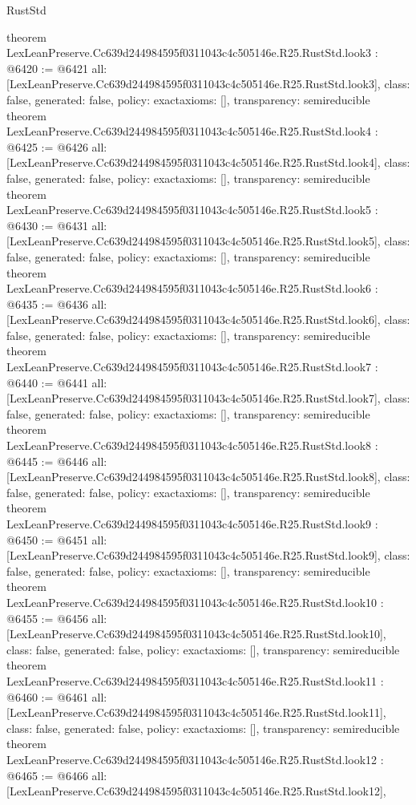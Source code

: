 \begin{lexlean}{RustStd}
\begin{coremodule}
{}
theorem LexLeanPreserve.Cc639d244984595f0311043c4c505146e.R25.RustStd.look3 : @6420 := @6421 {
  all: [LexLeanPreserve.Cc639d244984595f0311043c4c505146e.R25.RustStd.look3],
  class: false,
  generated: false,
  policy: exact{axioms: []},
  transparency: semireducible
}
theorem LexLeanPreserve.Cc639d244984595f0311043c4c505146e.R25.RustStd.look4 : @6425 := @6426 {
  all: [LexLeanPreserve.Cc639d244984595f0311043c4c505146e.R25.RustStd.look4],
  class: false,
  generated: false,
  policy: exact{axioms: []},
  transparency: semireducible
}
theorem LexLeanPreserve.Cc639d244984595f0311043c4c505146e.R25.RustStd.look5 : @6430 := @6431 {
  all: [LexLeanPreserve.Cc639d244984595f0311043c4c505146e.R25.RustStd.look5],
  class: false,
  generated: false,
  policy: exact{axioms: []},
  transparency: semireducible
}
theorem LexLeanPreserve.Cc639d244984595f0311043c4c505146e.R25.RustStd.look6 : @6435 := @6436 {
  all: [LexLeanPreserve.Cc639d244984595f0311043c4c505146e.R25.RustStd.look6],
  class: false,
  generated: false,
  policy: exact{axioms: []},
  transparency: semireducible
}
theorem LexLeanPreserve.Cc639d244984595f0311043c4c505146e.R25.RustStd.look7 : @6440 := @6441 {
  all: [LexLeanPreserve.Cc639d244984595f0311043c4c505146e.R25.RustStd.look7],
  class: false,
  generated: false,
  policy: exact{axioms: []},
  transparency: semireducible
}
theorem LexLeanPreserve.Cc639d244984595f0311043c4c505146e.R25.RustStd.look8 : @6445 := @6446 {
  all: [LexLeanPreserve.Cc639d244984595f0311043c4c505146e.R25.RustStd.look8],
  class: false,
  generated: false,
  policy: exact{axioms: []},
  transparency: semireducible
}
theorem LexLeanPreserve.Cc639d244984595f0311043c4c505146e.R25.RustStd.look9 : @6450 := @6451 {
  all: [LexLeanPreserve.Cc639d244984595f0311043c4c505146e.R25.RustStd.look9],
  class: false,
  generated: false,
  policy: exact{axioms: []},
  transparency: semireducible
}
theorem LexLeanPreserve.Cc639d244984595f0311043c4c505146e.R25.RustStd.look10 : @6455 := @6456 {
  all: [LexLeanPreserve.Cc639d244984595f0311043c4c505146e.R25.RustStd.look10],
  class: false,
  generated: false,
  policy: exact{axioms: []},
  transparency: semireducible
}
theorem LexLeanPreserve.Cc639d244984595f0311043c4c505146e.R25.RustStd.look11 : @6460 := @6461 {
  all: [LexLeanPreserve.Cc639d244984595f0311043c4c505146e.R25.RustStd.look11],
  class: false,
  generated: false,
  policy: exact{axioms: []},
  transparency: semireducible
}
theorem LexLeanPreserve.Cc639d244984595f0311043c4c505146e.R25.RustStd.look12 : @6465 := @6466 {
  all: [LexLeanPreserve.Cc639d244984595f0311043c4c505146e.R25.RustStd.look12],
}
\end{coremodule}
\end{lexlean}
